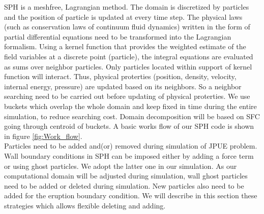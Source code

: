 \documentclass[10pt,a4paper]{article}
\begin{document}
SPH is a meshfree, Lagrangian method. The domain is discretized by particles and the position of particle is updated at every time step. The physical laws (such as conservation laws of continuum fluid dynamics) written in the form of partial differential equations need to be transformed into the Lagrangian formalism. Using a kernel function that provides the weighted estimate of the field variables at a discrete point (particle), the integral equations are evaluated as sums over neighbor particles. Only particles located within support of kernel function will interact. Thus, physical proterties (position, density, velocity, internal energy, pressure) are updated based on its neighbors. So a neighbor searching need to be carried out before updating of physical proterties. We use buckets which overlap the whole domain and keep fixed in time during the entire simulation, to reduce searching cost. Domain decomposition will be based on SFC going through centroid of buckets. A basic works flow of our SPH code is shown in figure \ref{fig:Work_flow}.\\

Particles need to be added and(or) removed during simulation of JPUE problem. Wall boundary conditions in SPH can be imposed either by adding a force term or using ghost particles. We adopt the latter one in our simulation. As our computational domain will be adjusted during simulation, wall ghost particles need to be added or deleted during simulation. New particles also need to be added for the eruption boundary condition. 
We will describe in this section these strategies which allows flexible deleting and adding.
\end{document}
